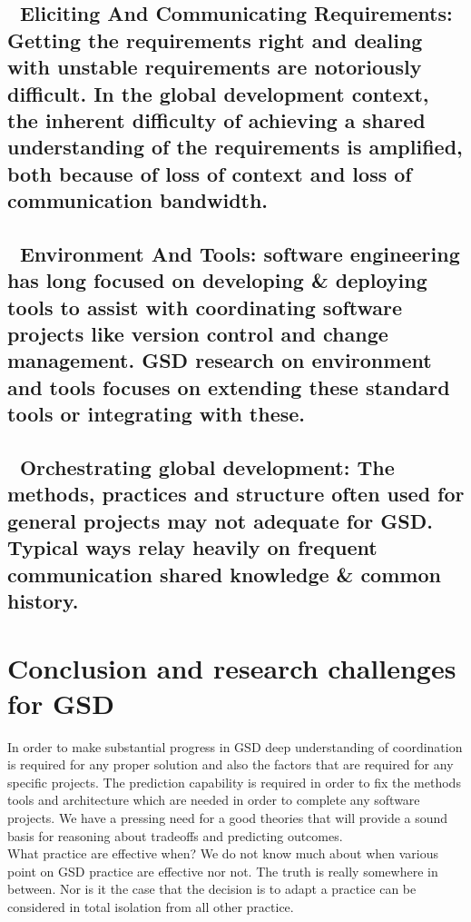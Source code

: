 \documentclass{article}
\begin{document}
\subsection*{	Eliciting And Communicating Requirements: Getting the requirements right and dealing with unstable requirements are notoriously difficult. In the global development context, the inherent difficulty of achieving a shared understanding of the requirements is amplified, both because of loss of context and loss of communication bandwidth.}
\subsection*{	Environment And Tools: software engineering has long focused on developing & deploying tools to assist with coordinating software projects like version control and change management. GSD research on environment and tools focuses on extending these standard tools or integrating with these.}
\subsection*{	Orchestrating global development: The methods, practices and structure often used for general projects may not adequate for GSD. Typical ways relay heavily on frequent communication shared knowledge & common history.}
\section{Conclusion and research challenges for GSD  }
In order to make substantial progress in GSD deep understanding of coordination is required for any proper solution and also the factors that are required for any specific projects. The prediction capability is required in order to fix the methods tools and architecture which are needed in order to complete any software projects. We have a pressing need for a good theories that will provide a sound basis for reasoning about tradeoffs and predicting outcomes. \\
What practice are effective when? We do not know much about when various point on GSD practice are effective nor not. The truth is really somewhere in between. Nor is it the case that the decision is to adapt a practice can be considered in total isolation  from all other practice.  
\end{document}
